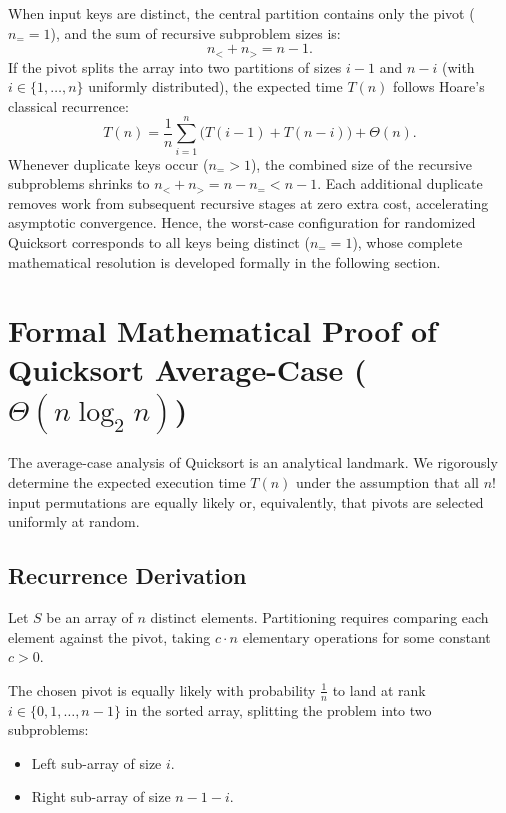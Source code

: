 When input keys are distinct, the central partition contains only the pivot ($n_= = 1$), and the sum of recursive subproblem sizes is:
\begin{equation}
  n_< + n_> = n - 1.
\end{equation}
If the pivot splits the array into two partitions of sizes $i - 1$ and $n - i$ (with $i \in \{1, \dots, n\}$ uniformly distributed), the expected time $T(n)$ follows Hoare's classical recurrence:
\begin{equation}
  T(n) = \frac{1}{n} \sum_{i=1}^{n} \Big( T(i - 1) + T(n - i) \Big) + \Theta(n).
\end{equation}
Whenever duplicate keys occur ($n_= > 1$), the combined size of the recursive subproblems shrinks to $n_< + n_> = n - n_= < n - 1$. Each additional duplicate removes work from subsequent recursive stages at zero extra cost, accelerating asymptotic convergence. Hence, the worst-case configuration for randomized Quicksort corresponds to all keys being distinct ($n_= = 1$), whose complete mathematical resolution is developed formally in the following section.

\FloatBarrier
\section{Formal Mathematical Proof of Quicksort Average-Case (\texorpdfstring{$\Theta(n \log_2 n)$}{Theta(n log n)})}
\label{sec:quicksort-average-case-proof}

The average-case analysis of Quicksort is an analytical landmark. We rigorously determine the expected execution time $T(n)$ under the assumption that all $n!$ input permutations are equally likely or, equivalently, that pivots are selected uniformly at random.

\subsection{Recurrence Derivation}
\label{subsec:quicksort-recurrence-derivation}

Let $S$ be an array of $n$ distinct elements. Partitioning requires comparing each element against the pivot, taking $c \cdot n$ elementary operations for some constant $c > 0$.

The chosen pivot is equally likely with probability $\frac{1}{n}$ to land at rank $i \in \{0, 1, \dots, n - 1\}$ in the sorted array, splitting the problem into two subproblems:
\begin{itemize}
  \item Left sub-array of size $i$.
  \item Right sub-array of size $n - 1 - i$.
\end{itemize}

